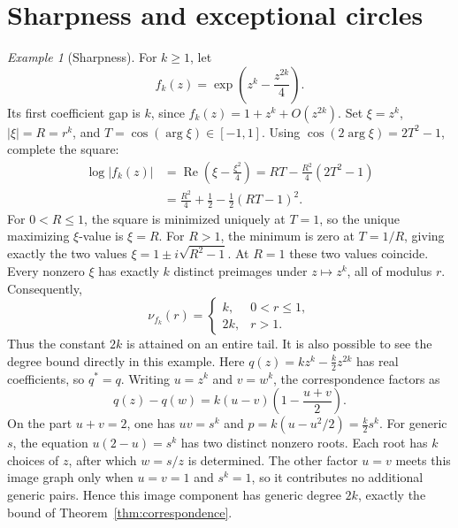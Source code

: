 \documentclass[11pt,reqno]{amsart}
\theoremstyle{remark}
\newtheorem{example}[theorem]{Example}
\numberwithin{equation}{section}
\DeclareMathOperator{\Rea}{Re}
\begin{document}
\section{Sharpness and exceptional circles}\label{sec:examples}
\begin{example}[Sharpness]\label{ex:sharp}
For $k\ge1$, let
\[
 f_k(z)=\exp\!\left(z^k-\frac{z^{2k}}4\right).
\]
Its first coefficient gap is $k$, since $f_k(z)=1+z^k+O(z^{2k})$.
Set $\xi=z^k$, $|\xi|=R=r^k$, and
$T=\cos(\arg\xi)\in[-1,1]$.
Using $\cos(2\arg\xi)=2T^2-1$, complete the square:
\[
 \begin{split}
 \log|f_k(z)|
 &=\Rea\!\left(\xi-\frac{\xi^2}{4}\right)
 =RT-\frac{R^2}{4}(2T^2-1)\\
 &=\frac{R^2}{4}+\frac12-\frac12(RT-1)^2.
 \end{split}
\]
For $0<R\le1$, the square is minimized uniquely at $T=1$,
so the unique maximizing $\xi$-value is $\xi=R$. For $R>1$,
the minimum is zero at $T=1/R$, giving exactly the two values
$\xi=1\pm i\sqrt{R^2-1}$. At $R=1$ these two values coincide.
Every nonzero $\xi$ has exactly $k$ distinct preimages under
$z\mapsto z^k$, all of modulus $r$. Consequently,
\[
 \nu_{f_k}(r)=
 \begin{cases}
 k,&0<r\le1,\\
 2k,&r>1.
 \end{cases}
\]
Thus the constant $2k$ is attained on an entire tail.
It is also possible to see the degree bound directly in this
example. Here $q(z)=kz^k-\frac{k}{2}z^{2k}$ has real coefficients,
so $q^*=q$. Writing
$u=z^k$ and $v=w^k$, the correspondence factors as
\[
 q(z)-q(w)=k(u-v)\left(1-\frac{u+v}{2}\right).
\]
On the part $u+v=2$, one has $uv=s^k$ and
$p=k(u-u^2/2)=\frac{k}{2}s^k$.
For generic $s$, the equation $u(2-u)=s^k$ has two distinct
nonzero roots. Each root has $k$ choices of $z$, after which
$w=s/z$ is determined. The other factor $u=v$ meets this
image graph only when $u=v=1$ and $s^k=1$, so it contributes
no additional generic pairs. Hence this image component has
generic degree $2k$, exactly the bound of
Theorem~\ref{thm:correspondence}.
\end{example}
\end{document}
